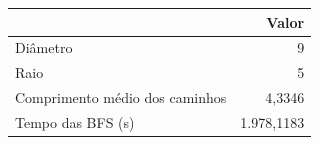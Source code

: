 \begin{tabular}{lr}
\toprule
 & Valor \\
\midrule
Diâmetro & 9 \\
Raio & 5 \\
Comprimento médio dos caminhos & 4,3346 \\
Tempo das BFS (s) & 1.978,1183 \\
\bottomrule
\end{tabular}
